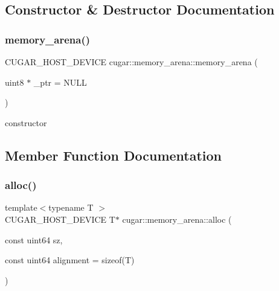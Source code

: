\subsection{Constructor \& Destructor Documentation}
\mbox{\label{structcugar_1_1memory__arena_a45eb7c6eccc45c97658c841b4cf7380a}} 
\subsubsection{\texorpdfstring{memory\+\_\+arena()}{memory\_arena()}}
{\footnotesize\ttfamily C\+U\+G\+A\+R\+\_\+\+H\+O\+S\+T\+\_\+\+D\+E\+V\+I\+CE cugar\+::memory\+\_\+arena\+::memory\+\_\+arena (\begin{DoxyParamCaption}\item[{uint8 $\ast$}]{\+\_\+ptr = {\ttfamily NULL} }\end{DoxyParamCaption})\hspace{0.3cm}{\ttfamily [inline]}}

constructor 

\subsection{Member Function Documentation}
\mbox{\label{structcugar_1_1memory__arena_afcbc6673ae3fa3e61368495ed2041621}} 
\subsubsection{\texorpdfstring{alloc()}{alloc()}}
{\footnotesize\ttfamily template$<$typename T $>$ \\
C\+U\+G\+A\+R\+\_\+\+H\+O\+S\+T\+\_\+\+D\+E\+V\+I\+CE T$\ast$ cugar\+::memory\+\_\+arena\+::alloc (\begin{DoxyParamCaption}\item[{const uint64}]{sz,  }\item[{const uint64}]{alignment = {\ttfamily sizeof(T)} }\end{DoxyParamCaption})\hspace{0.3cm}{\ttfamily [inline]}}

